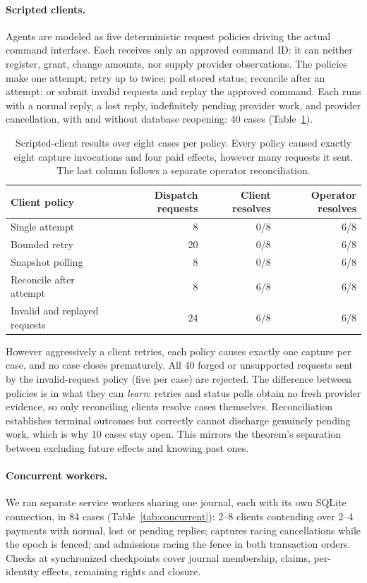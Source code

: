\documentclass[runningheads]{llncs}
\begin{document}
\paragraph{Scripted clients.}
Agents are modeled as five deterministic request policies driving the actual
command interface. Each receives only an approved command ID: it can neither
register, grant, change amounts, nor supply provider observations. The policies
make one attempt; retry up to twice; poll stored status; reconcile after an
attempt; or submit invalid requests and replay the approved command. Each runs
with a normal reply, a lost reply, indefinitely pending provider work, and
provider cancellation, with and without database reopening: 40 cases
(Table~\ref{tab:agents}).

\begin{table}[t]
\centering\small
\caption{Scripted-client results over eight cases per policy. Every policy
caused exactly eight capture invocations and four paid effects, however many
requests it sent. The last column follows a separate operator reconciliation.}
\label{tab:agents}
\begin{tabularx}{\linewidth}{@{}>{\raggedright\arraybackslash}X r r r@{}}
\toprule
Client policy & Dispatch requests & Client resolves & Operator resolves \\
\midrule
Single attempt & 8 & 0/8 & 6/8 \\
Bounded retry & 20 & 0/8 & 6/8 \\
Snapshot polling & 8 & 0/8 & 6/8 \\
Reconcile after attempt & 8 & 6/8 & 6/8 \\
Invalid and replayed requests & 24 & 6/8 & 6/8 \\
\bottomrule
\end{tabularx}
\end{table}

However aggressively a client retries, each policy causes exactly one capture
per case, and no case closes prematurely. All 40 forged or unsupported
requests sent by the invalid-request policy (five per case) are rejected. The difference between policies is in what they can
\emph{learn}: retries and status polls obtain no fresh provider evidence, so
only reconciling clients resolve cases themselves. Reconciliation establishes
terminal outcomes but correctly cannot discharge genuinely pending work, which
is why 10 cases stay open. This mirrors the theorem's separation between
excluding future effects and knowing past ones.

\paragraph{Concurrent workers.}
We ran separate service workers sharing one journal, each with its own SQLite
connection, in 84 cases (Table~\ref{tab:concurrent}): 2--8 clients contending
over 2--4 payments with normal, lost or pending replies; captures racing
cancellations while the epoch is fenced; and admissions racing the fence in both
transaction orders. Checks at synchronized checkpoints cover journal membership,
claims, per-identity effects, remaining rights and closure.
\end{document}
